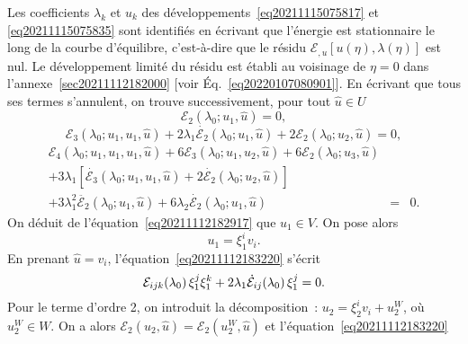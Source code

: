 \documentclass{article}
\begin{document}
Les coefficients $\lambda_k$ et $u_k$ des
d{\'e}veloppements~\eqref{eq20211115075817} et \eqref{eq20211115075835} sont
identifi{\'e}s en {\'e}crivant que l'{\'e}nergie est stationnaire le long de
la courbe d'{\'e}quilibre, c'est-{\`a}-dire que le r{\'e}sidu $\mathcal{E}_{,
u}  [u (\eta), \lambda (\eta)]$ est nul. Le d{\'e}veloppement limit{\'e} du
r{\'e}sidu est {\'e}tabli au voisinage de $\eta = 0$ dans
l'annexe~\ref{sec20211112182000} [voir {\'E}q.~\eqref{eq20220107080901}]. En
{\'e}crivant que tous ses termes s'annulent, on trouve successivement, pour
tout $\hat{u} \in U$
\begin{equation}
  \label{eq20211112182917} \mathcal{E}_2 (\lambda_0 ; u_1, \hat{u}) = 0,
\end{equation}
\begin{equation}
  \label{eq20211112183220} \mathcal{E}_3 (\lambda_0 ; u_1, u_1, \hat{u}) + 2
  \lambda_1  \dot{\mathcal{E}_2} (\lambda_0 ; u_1, \hat{u}) + 2\mathcal{E}_2
  (\lambda_0 ; u_2, \hat{u}) = 0,
\end{equation}
\begin{eqnarray}
  \mathcal{E}_4 (\lambda_0 ; u_1, u_1, u_1, \hat{u}) + 6\mathcal{E}_3
  (\lambda_0 ; u_1, u_2, \hat{u}) + 6\mathcal{E}_2 (\lambda_0 ; u_3, \hat{u})
  &  &  \nonumber\\
  + 3 \lambda_1  [\dot{\mathcal{E}_3} (\lambda_0 ; u_1, u_1, \hat{u}) + 2
  \dot{\mathcal{E}_2} (\lambda_0 ; u_2, \hat{u})] &  &  \nonumber\\
  + 3 \lambda_1^2  \ddot{\mathcal{E}_2} (\lambda_0 ; u_1, \hat{u}) + 6
  \lambda_2  \dot{\mathcal{E}_2} (\lambda_0 ; u_1, \hat{u}) & = & 0.
  \label{eq20220114135717}
\end{eqnarray}
On d{\'e}duit de l'{\'e}quation~\eqref{eq20211112182917} que $u_1 \in V$. On
pose alors
\begin{equation}
  \label{eq20220124135236} u_1 = \xi_1^i v_i .
\end{equation}
En prenant $\hat{u} = v_i$, l'{\'e}quation~\eqref{eq20211112183220}
s'{\'e}crit
\begin{equation}
  \label{eq20220216140121} \mathcal{E}_{i  j  k} (\lambda_0)
  \hspace{0.17em} \xi_1^j \xi_1^k + 2 \lambda_1  \dot{\mathcal{E}}_{i
  j} (\lambda_0)  \hspace{0.17em} \xi_1^j = 0.
\end{equation}
Pour le terme d'ordre 2, on introduit la d{\'e}composition~: $u_2 = \xi_2^i
v_i + u_2^W$, o{\`u} $u_2^W \in W$. On a alors $\mathcal{E}_2 (u_2, \hat{u})
=\mathcal{E}_2 (u_2^W, \hat{u})$ et l'{\'e}quation~\eqref{eq20211112183220}
\end{document}
